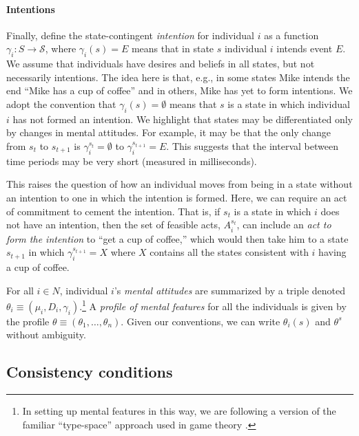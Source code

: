 \documentclass[
11pt,
titlepage,
reqno,
]{article}%
\theoremstyle{definition}
\begin{document}
	\paragraph*{Intentions \label{para: intentions}}
	
	
	
	Finally, define the state-contingent \textit{intention} for individual $i$ as a function $\gamma_i:S\rightarrow \mathcal{S}$, where $\gamma_i(s)=E$ means that in state $s$ individual $i$ intends event $E$. 
	We assume that individuals have desires and beliefs in all states, but not necessarily intentions. 
	The idea here is that, e.g., in some states Mike intends the end ``Mike has a cup of coffee'' and in others, Mike has yet to form intentions.
	We adopt the convention that $\gamma_i(s)=\emptyset$ means that $s$ is a state in which individual $i$ has not formed an intention. 
	We highlight that states may be differentiated only by changes in mental attitudes. 
	For example, it may be that the only change from $s_t$ to $s_{t+1}$ is $\gamma_i^{s_t}=\emptyset$ to $\gamma_i^{s_{t+1}}=E$.
	This suggests that the interval between time periods may be very short (measured in milliseconds).
	
	This raises the question of how an individual moves from being in a state without an intention to one in which the intention is formed. 
	Here, we can require an act of commitment to cement the intention. 
	That is, if $s_t$ is a state in which $i$ does not have an intention, then the set of feasible acts, $A^{s_t}_i$, can include an \textit{act to form the intention} to ``get a cup of coffee,'' which would then take him to a state $s_{t+1}$ in which $\gamma_i^{s_{t+1}}=X$ where $X$ contains all the states consistent with $i$ having a cup of coffee.
	
	For all $i\in N$, individual $i$'s \textit{mental attitudes} are summarized by a triple denoted $\theta_i\equiv(\mu_i,D_i,\gamma_i)$.\footnote
	{
		In setting up mental features in this way, we are following a version of the familiar ``type-space'' approach used in game theory \citep[See][]{Harsanyi1967, Mertens1985a}. 
	} 
	A \textit{profile of mental features} for all the individuals is given by the profile $\theta\equiv(\theta_1,\ldots,\theta_n)$. 
	Given our conventions, we can write $\theta_i(s)$ and $\theta^s$ without ambiguity.
	
	
	\subsection{Consistency conditions\label{sec:consistencies}}
	
\end{document}
